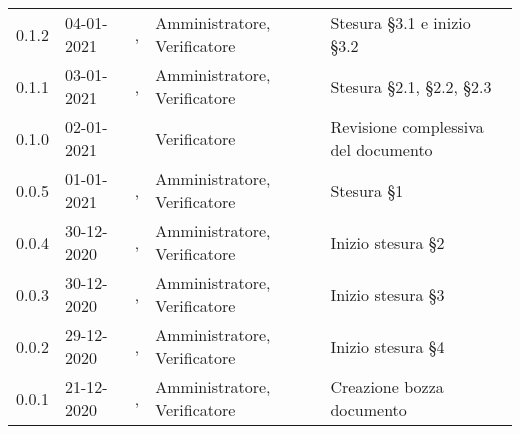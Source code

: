 {\begin{longtable}{C{1.7cm} C{2.5cm} C{3.2cm} C{2.9cm} C{4.6cm}}
0.1.2 & 04-01-2021 & \ZM{}, \BM{} & Amministratore, Verificatore & Stesura \S 3.1 e inizio \S 3.2\\
0.1.1 & 03-01-2021 & \PA{}, \SP{} & Amministratore, Verificatore & Stesura \S 2.1, \S 2.2, \S 2.3 \\
0.1.0 & 02-01-2021 & \BM{} & Verificatore & Revisione complessiva del documento \\
0.0.5 & 01-01-2021 & \ZM{}, \SP{} & Amministratore, Verificatore & Stesura \S 1\\
0.0.4 & 30-12-2020 & \PA{}, \SP{} & Amministratore, Verificatore & Inizio stesura \S 2 \\
0.0.3 & 30-12-2020 & \ZM{}, \BM{} & Amministratore, Verificatore & Inizio stesura \S 3\\
0.0.2 & 29-12-2020 & \RA{}, \SP{} & Amministratore, Verificatore & Inizio stesura \S 4 \\
0.0.1 & 21-12-2020 & \ZM{}, \BM{} & Amministratore, Verificatore & Creazione bozza documento \\	
\end{longtable}
}
